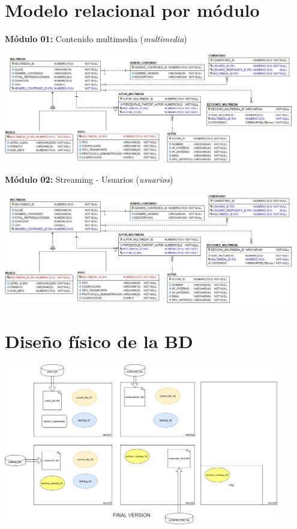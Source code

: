 \documentclass{article}
\begin{document}
\section*{Modelo relacional por módulo}

\textbf{Módulo 01:} Contenido multimedia (\textit{multimedia})

\begin{center}
\includegraphics[width=0.95\textwidth]{media-stream-modulo-01}
\end{center}

\textbf{Módulo 02:} Streaming - Usuarios (\textit{usuarios})

\begin{center}
\includegraphics[width=0.95\textwidth]{media-stream-modulo-01}
\end{center}

\section{Diseño físico de la BD}

\includegraphics[width=0.9\textwidth]{arquitectura-bd-mediastream.png}
\end{document}
